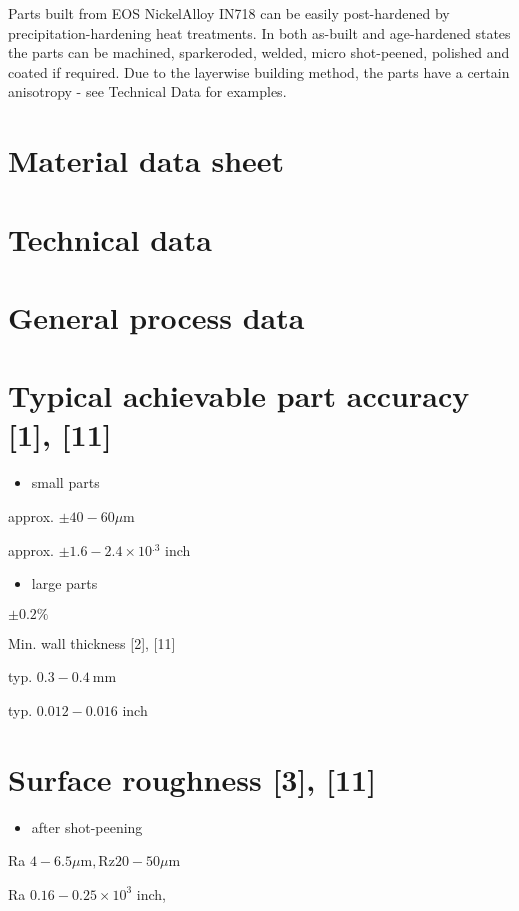 \documentclass[10pt]{article}
\begin{document}
Parts built from EOS NickelAlloy IN718 can be easily post-hardened by precipitation-hardening heat treatments. In both as-built and age-hardened states the parts can be machined, sparkeroded, welded, micro shot-peened, polished and coated if required. Due to the layerwise building method, the parts have a certain anisotropy - see Technical Data for examples.

\section*{Material data sheet}
\section*{Technical data}
\section*{General process data}
\section*{Typical achievable part accuracy [1], [11]}
\begin{itemize}
  \item small parts
\end{itemize}

approx. $\pm 40-60 \mu \mathrm{m}$

approx. $\pm 1.6-2.4 \times 10{ }^{.3}$ inch

\begin{itemize}
  \item large parts
\end{itemize}

$\pm 0.2 \%$

Min. wall thickness [2], [11]

typ. $0.3-0.4 \mathrm{~mm}$

typ. $0.012-0.016$ inch

\section*{Surface roughness [3], [11]}
\begin{itemize}
  \item after shot-peening
\end{itemize}

Ra $4-6.5 \mu \mathrm{m}, \mathrm{Rz} 20-50 \mu \mathrm{m}$

Ra $0.16-0.25 \times 10^{3}$ inch,
\end{document}
